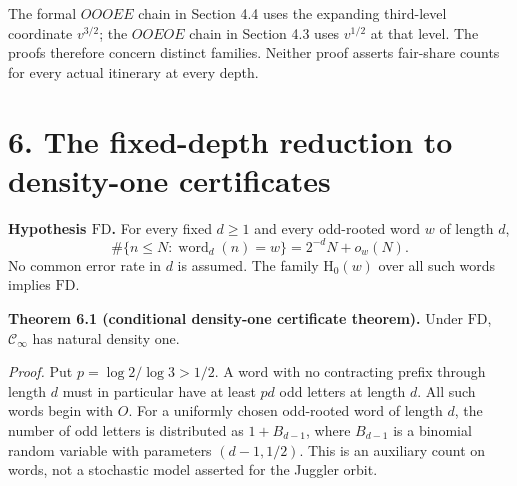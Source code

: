 \documentclass[11pt,a4paper]{article}
\begin{document}
\endgroup

The formal \(OOOEE\) chain in Section 4.4 uses the expanding third-level
coordinate \(v^{3/2}\); the \(OOEOE\) chain in Section 4.3 uses
\(v^{1/2}\) at that level. The proofs therefore concern distinct
families. Neither proof asserts fair-share counts for every actual
itinerary at every depth.


\section{6. The fixed-depth reduction to density-one
certificates}\label{the-fixed-depth-reduction-to-density-one-certificates}

\textbf{Hypothesis \(\mathrm{FD}\).} For every fixed \(d\ge1\) and every
odd-rooted word \(w\) of length \(d\), \[
\#\{n\le N:\operatorname{word}_d(n)=w\}=2^{-d}N+o_w(N).
\] No common error rate in \(d\) is assumed. The family
\(\mathrm H_0(w)\) over all such words implies \(\mathrm{FD}\).


\textbf{Theorem 6.1 (conditional density-one certificate theorem).}
Under \(\mathrm{FD}\), \(\mathcal C_\infty\) has natural density one.

\emph{Proof.} Put \(p=\log2/\log3>1/2\). A word with no contracting
prefix through length \(d\) must in particular have at least \(pd\) odd
letters at length \(d\). All such words begin with \(O\). For a
uniformly chosen odd-rooted word of length \(d\), the number of odd
letters is distributed as \(1+B_{d-1}\), where \(B_{d-1}\) is a binomial
random variable with parameters \((d-1,1/2)\). This is an auxiliary
count on words, not a stochastic model asserted for the Juggler orbit.
\end{document}
